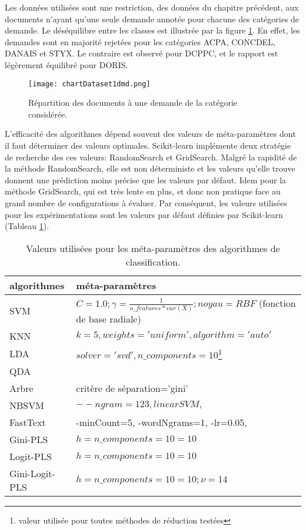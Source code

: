 Les données utilisées sont une restriction, des données du chapitre précédent, aux documents n'ayant qu'une seule demande annotée pour chacune des catégories de demande. Le déséquilibre entre les classes est illustrée par la figure \ref{fig:sensresultat:stat-1dmd}. En effet, les demandes sont en majorité rejetées pour les catégories ACPA, CONCDEL, DANAIS et STYX. Le contraire est observé pour DCPPC, et le rapport est légèrement équilibré pour DORIS.
\begin{figure}[htb]
\texttt{[image: chartDataset1dmd.png]}
\caption{Répartition des documents à une demande de la catégorie considérée.}\label{fig:sensresultat:stat-1dmd}
\end{figure}

L'efficacité des algorithmes dépend souvent des valeurs de méta-paramètres dont il faut déterminer des valeurs optimales. Scikit-learn implémente deux stratégie de recherche des ces valeurs: RandomSearch et GridSearch. Malgré la rapidité de la méthode RandomSearch, elle est non déterministe et les valeurs qu'elle trouve donnent une prédiction moins précise que les valeurs par défaut. Idem pour la méthode GridSearch, qui est très lente en plus, et donc non pratique face au grand nombre de configurations à évaluer. Par conséquent, les valeurs utilisées pour les expérimentations sont les valeurs par défaut définies par Scikit-learn (Tableau \ref{tab:sensrst:metapara}).

\begin{table}[htb]
	\scriptsize
	\centering
	\begin{tabular}{|l|p{}|}
		\hline
		algorithmes & méta-paramètres\\ \hline
		SVM & $C=1.0; \gamma=\frac{1}{n\_features * var(X)}; noyau=RBF$ (fonction de base radiale)\\ \hline
		KNN & $k = 5, weights='uniform', algorithm='auto'$ \\ \hline
		LDA &  $solver='svd', n\_components=10$\footnote{valeur utilisée pour toutes méthodes de réduction testées}  \\ \hline
		QDA &   \\ \hline
		Arbre & critère de séparation='gini' \\ \hline
		NBSVM & $--ngram=123, linearSVM, $ \\ \hline
		FastText & -minCount=5, -wordNgrams=1, -lr=0.05,    \\ \hline
		Gini-PLS & $h=n\_components=10=10$ \\ \hline
		Logit-PLS & $h=n\_components=10=10$  \\ \hline
		Gini-Logit-PLS & $h=n\_components=10=10; \nu = 14$ \\ \hline
	\end{tabular}
	\caption{Valeurs utilisées pour les méta-paramètres des algorithmes de classification.}\label{tab:sensrst:metapara}
\end{table}

